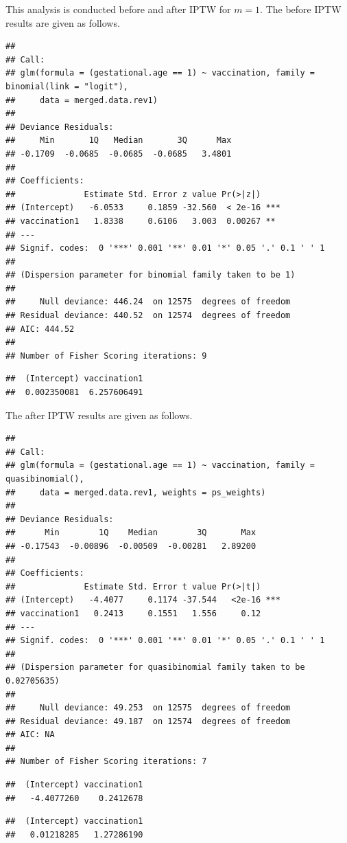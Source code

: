 \documentclass[
]{article}
\begin{document}
This analysis is conducted before and after IPTW for \(m = 1\). The
before IPTW results are given as follows.

\begin{verbatim}
## 
## Call:
## glm(formula = (gestational.age == 1) ~ vaccination, family = binomial(link = "logit"), 
##     data = merged.data.rev1)
## 
## Deviance Residuals: 
##     Min       1Q   Median       3Q      Max  
## -0.1709  -0.0685  -0.0685  -0.0685   3.4801  
## 
## Coefficients:
##              Estimate Std. Error z value Pr(>|z|)    
## (Intercept)   -6.0533     0.1859 -32.560  < 2e-16 ***
## vaccination1   1.8338     0.6106   3.003  0.00267 ** 
## ---
## Signif. codes:  0 '***' 0.001 '**' 0.01 '*' 0.05 '.' 0.1 ' ' 1
## 
## (Dispersion parameter for binomial family taken to be 1)
## 
##     Null deviance: 446.24  on 12575  degrees of freedom
## Residual deviance: 440.52  on 12574  degrees of freedom
## AIC: 444.52
## 
## Number of Fisher Scoring iterations: 9
\end{verbatim}

\begin{verbatim}
##  (Intercept) vaccination1 
##  0.002350081  6.257606491
\end{verbatim}

The after IPTW results are given as follows.

\begin{verbatim}
## 
## Call:
## glm(formula = (gestational.age == 1) ~ vaccination, family = quasibinomial(), 
##     data = merged.data.rev1, weights = ps_weights)
## 
## Deviance Residuals: 
##      Min        1Q    Median        3Q       Max  
## -0.17543  -0.00896  -0.00509  -0.00281   2.89200  
## 
## Coefficients:
##              Estimate Std. Error t value Pr(>|t|)    
## (Intercept)   -4.4077     0.1174 -37.544   <2e-16 ***
## vaccination1   0.2413     0.1551   1.556     0.12    
## ---
## Signif. codes:  0 '***' 0.001 '**' 0.01 '*' 0.05 '.' 0.1 ' ' 1
## 
## (Dispersion parameter for quasibinomial family taken to be 0.02705635)
## 
##     Null deviance: 49.253  on 12575  degrees of freedom
## Residual deviance: 49.187  on 12574  degrees of freedom
## AIC: NA
## 
## Number of Fisher Scoring iterations: 7
\end{verbatim}

\begin{verbatim}
##  (Intercept) vaccination1 
##   -4.4077260    0.2412678
\end{verbatim}

\begin{verbatim}
##  (Intercept) vaccination1 
##   0.01218285   1.27286190
\end{verbatim}
\end{document}
